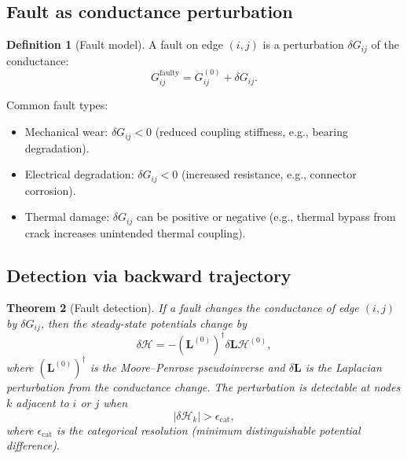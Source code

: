 \documentclass[twocolumn,10pt,a4paper]{article}
\newtheorem{theorem}{Theorem}[section]
\theoremstyle{definition}
\newtheorem{definition}[theorem]{Definition}
\theoremstyle{remark}
\newcommand{\Hcal}{\mathcal{H}}
\newcommand{\vect}[1]{\boldsymbol{#1}}
\newcommand{\mat}[1]{\mathbf{#1}}
\begin{document}
\subsection{Fault as conductance perturbation}

\begin{definition}[Fault model]\label{def:fault}
A fault on edge $(i, j)$ is a perturbation $\delta G_{ij}$ of the conductance:
\begin{equation}\label{eq:fault}
    G_{ij}^{\mathrm{faulty}} = G_{ij}^{(0)} + \delta G_{ij}.
\end{equation}
\end{definition}

Common fault types:
\begin{itemize}
    \item Mechanical wear: $\delta G_{ij} < 0$ (reduced coupling stiffness, e.g., bearing degradation).
    \item Electrical degradation: $\delta G_{ij} < 0$ (increased resistance, e.g., connector corrosion).
    \item Thermal damage: $\delta G_{ij}$ can be positive or negative (e.g., thermal bypass from crack increases unintended thermal coupling).
\end{itemize}

\subsection{Detection via backward trajectory}

\begin{theorem}[Fault detection]\label{thm:fault_detection}
If a fault changes the conductance of edge $(i, j)$ by $\delta G_{ij}$, then the steady-state potentials change by
\begin{equation}\label{eq:fault_response}
    \delta \vect{\Hcal} = -(\mat{L}^{(0)})^\dagger \delta \mat{L} \vect{\Hcal}^{(0)},
\end{equation}
where $(\mat{L}^{(0)})^\dagger$ is the Moore--Penrose pseudoinverse and $\delta \mat{L}$ is the Laplacian perturbation from the conductance change. The perturbation is detectable at nodes $k$ adjacent to $i$ or $j$ when
\begin{equation}\label{eq:detection_condition}
    |\delta \Hcal_k| > \epsilon_{\mathrm{cat}},
\end{equation}
where $\epsilon_{\mathrm{cat}}$ is the categorical resolution (minimum distinguishable potential difference).
\end{theorem}
\end{document}
